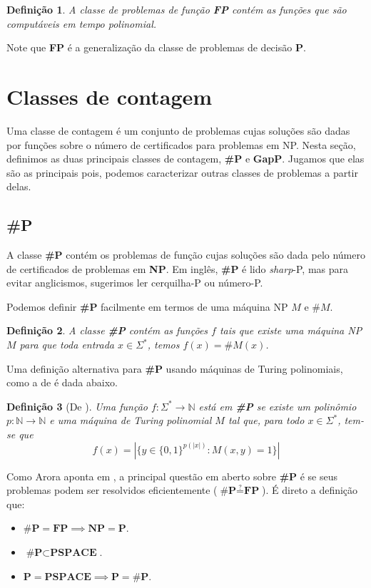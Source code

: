 \documentclass[paper=a4, fontsize=11pt]{scrartcl} %
\newtheorem{definition}{Definição}
\numberwithin{equation}{section} %
\numberwithin{figure}{section} %
\numberwithin{table}{section} %
\numberwithin{definition}{section}
\numberwithin{theorem}{section}
\newcommand{\mwords}{\Sigma^*\xspace}
\renewcommand{\P}{\textbf{P}\xspace}
\newcommand{\SP}{\textbf{\#P}\xspace}
\newcommand{\NP}{\textbf{NP}\xspace}
\newcommand{\FP}{\textbf{FP}\xspace}
\newcommand{\gP}{\textbf{GapP}\xspace}
\newcommand{\PSPACE}{\textbf{PSPACE}\xspace}
\begin{document}
\begin{definition} A classe de problemas de função \FP contém as funções que são computáveis em tempo polinomial.
\end{definition}

Note que \FP é a generalização da classe de problemas de decisão \P.



\pagebreak
\section{Classes de contagem}

Uma classe de contagem é um conjunto de problemas cujas soluções são dadas por funções sobre o número de certificados para problemas em NP. Nesta seção, definimos as duas principais classes de contagem, \SP e \gP. Jugamos que elas são as principais pois, podemos caracterizar outras classes de problemas a partir delas.

\subsection{\SP}

A classe \SP contém os problemas de função cujas soluções são dada pelo número de certificados de problemas em \NP. Em inglês, \SP é lido \textit{sharp}-P, mas para evitar anglicismos, sugerimos ler cerquilha-P ou número-P.

Podemos definir \SP facilmente em termos de uma máquina NP $M$ e $\#M$.
\begin{definition} A classe \SP contém as funções $f$ tais que existe uma máquina NP $M$ para que toda entrada $x \in \mwords$, temos $f(x) = \#M(x)$.
\end{definition}

Uma definição alternativa para \SP usando máquinas de Turing polinomiais, como  a de \cite{Arora09} é dada abaixo.
\begin{definition}[De \cite{Arora09}] Uma função $f:\mwords \rightarrow \mathbb{N}$ está em \SP se existe um polinômio $p:\mathbb{N} \rightarrow \mathbb{N}$ e uma máquina de Turing polinomial $M$ tal que, para todo $x \in \mwords$, tem-se que
$$
f(x) = \left| \{ y \in \{0, 1\}^{p(|x|)}: M(x, y) = 1 \} \right|
$$
\end{definition}

Como Arora aponta em \cite{Arora09}, a principal questão em aberto sobre \SP é se seus problemas podem ser resolvidos eficientemente ($ \SP \stackrel{?}{=} \FP $). É direto a definição que:
\begin{itemize}
  \item $ \SP = \FP \implies \NP = \P $.
  \item $ \SP \subset \PSPACE $.
  \item $ \P = \PSPACE \implies \P = \SP $.
\end{itemize}
\end{document}
